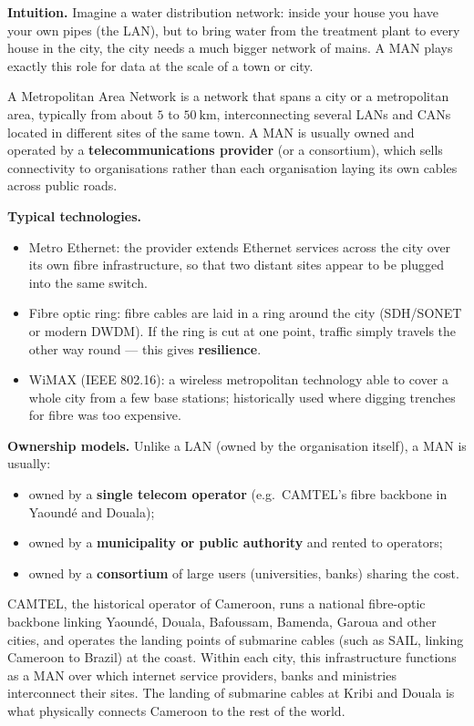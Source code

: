 \documentclass[11pt]{article}
\newcommand{\cle}[1]{{\popxbold\color{popdark}#1}}
\newcounter{popsec}
\newcounter{popsub}
\newcommand{\courssub}[1]{%
  \stepcounter{popsub}%
  \par\vspace{9pt}\noindent{\popxbold\fontsize{11.5}{13}\selectfont\color{popink}{\color{poporange}\thepopsec.\thepopsub}\hspace{6pt}#1}\par\nopagebreak\vspace{4pt}
}
\begin{document}
\courssub{Metropolitan Area Networks (MAN)}

\textbf{Intuition.} Imagine a water distribution network: inside your house you have your own pipes (the LAN), but to bring water from the treatment plant to every house in the city, the city needs a much bigger network of mains. A MAN plays exactly this role for data at the scale of a town or city.

\begin{definition}
A \cle{Metropolitan Area Network} is a network that spans a city or a metropolitan area, typically from about $5$ to $50\ \mathrm{km}$, interconnecting several LANs and CANs located in different sites of the same town. A MAN is usually owned and operated by a \textbf{telecommunications provider} (or a consortium), which sells connectivity to organisations rather than each organisation laying its own cables across public roads.
\end{definition}

\textbf{Typical technologies.}
\begin{itemize}
\item \cle{Metro Ethernet}: the provider extends Ethernet services across the city over its own fibre infrastructure, so that two distant sites appear to be plugged into the same switch.
\item \cle{Fibre optic ring}: fibre cables are laid in a ring around the city (SDH/SONET or modern DWDM). If the ring is cut at one point, traffic simply travels the other way round — this gives \textbf{resilience}.
\item \cle{WiMAX} (IEEE 802.16): a wireless metropolitan technology able to cover a whole city from a few base stations; historically used where digging trenches for fibre was too expensive.
\end{itemize}

\textbf{Ownership models.} Unlike a LAN (owned by the organisation itself), a MAN is usually:
\begin{itemize}
\item owned by a \textbf{single telecom operator} (e.g.\ CAMTEL's fibre backbone in Yaoundé and Douala);
\item owned by a \textbf{municipality or public authority} and rented to operators;
\item owned by a \textbf{consortium} of large users (universities, banks) sharing the cost.
\end{itemize}

\begin{savaistu}
CAMTEL, the historical operator of Cameroon, runs a national fibre-optic backbone linking Yaoundé, Douala, Bafoussam, Bamenda, Garoua and other cities, and operates the landing points of submarine cables (such as SAIL, linking Cameroon to Brazil) at the coast. Within each city, this infrastructure functions as a MAN over which internet service providers, banks and ministries interconnect their sites. The landing of submarine cables at Kribi and Douala is what physically connects Cameroon to the rest of the world.
\end{savaistu}
\end{document}
